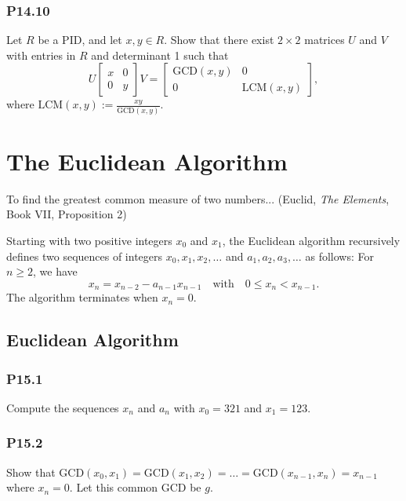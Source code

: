 \documentclass[lang=cn,11pt]{template}
\begin{document}
\subsection*{P14.10} Let \( R \) be a PID, and let \( x, y \in R \). Show that there exist \( 2 \times 2 \) matrices \( U \) and \( V \) with entries in \( R \) and determinant 1 such that
\[
U \begin{bmatrix} x & 0 \\ 0 & y \end{bmatrix} V = \begin{bmatrix} \text{GCD}(x, y) & 0 \\ 0 & \text{LCM}(x, y) \end{bmatrix},
\]
where \( \text{LCM}(x, y) := \frac{xy}{\text{GCD}(x, y)} \).










\chapter{The Euclidean Algorithm}

\begin{remark}
To find the greatest common measure of two numbers... (Euclid, \textit{The Elements}, Book VII, Proposition 2)
\end{remark}

Starting with two positive integers \( x_0 \) and \( x_1 \), the Euclidean algorithm recursively defines two sequences of integers \( x_0, x_1, x_2, \dots \) and \( a_1, a_2, a_3, \dots \) as follows: For \( n \geq 2 \), we have
\[
x_n = x_{n-2} - a_{n-1} x_{n-1} \quad \text{with} \quad 0 \leq x_n < x_{n-1}.
\]
The algorithm terminates when \( x_n = 0 \).


\section{Euclidean Algorithm}
\subsection*{P15.1} Compute the sequences \( x_n \) and \( a_n \) with \( x_0 = 321 \) and \( x_1 = 123 \).

\subsection*{P15.2} Show that \( \text{GCD}(x_0, x_1) = \text{GCD}(x_1, x_2) = \dots = \text{GCD}(x_{n-1}, x_n) = x_{n-1} \) where \( x_n = 0 \). Let this common GCD be \( g \).
\end{document}
